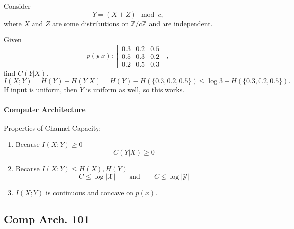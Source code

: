 \documentclass[12pt]{article}
\begin{document}
Consider
\[Y=(X+Z)\mod{c},\]
where $X$ and $Z$ are some distributions on $\mathbb{Z}/c\mathbb{Z}$ and are independent.

Given 
\[p(y|x):\begin{bmatrix}
    0.3&0.2&0.5\\
    0.5&0.3&0.2\\
    0.2&0.5&0.3
\end{bmatrix},\]
find $C(Y|X).$
\[I(X;Y)=H(Y)-H(Y|X)=H(Y)-H(\{0.3,0.2,0.5\})\le \log 3-H(\{0.3,0.2,0.5\}).\]
If input is uniform, then $Y$ is uniform as well, so this works.


\paragraph{Computer Architecture}
Properties of Channel Capacity:

\begin{enumerate}
    \item Because $I(X;Y)\ge 0$ \[C(Y|X)\ge 0\]
    \item Because $I(X;Y)\le H(X),H(Y)$ \[C\le \log|\mathscr{X}| \qquad\text{and}\qquad C\le\log|\mathscr{Y}|\]
    \item $I(X;Y)$ is continuous and concave on $p(x).$
\end{enumerate}


\subsection{Comp Arch. 101}


\end{document}
